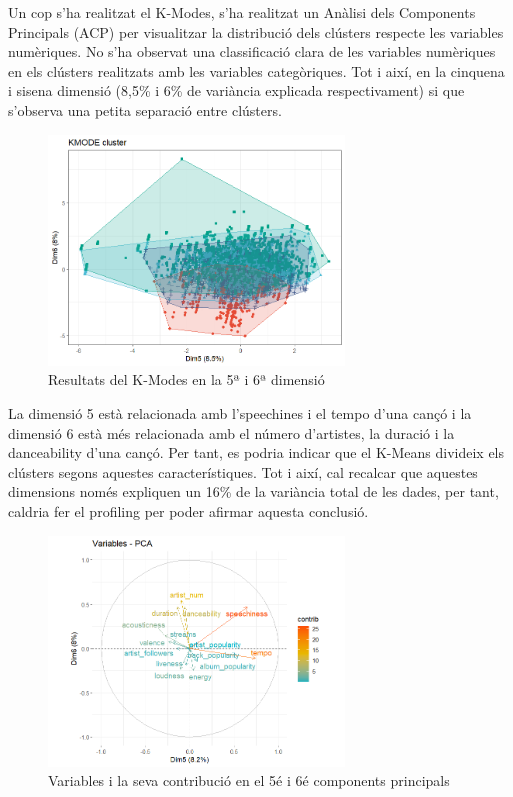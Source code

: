 Un cop s'ha realitzat el K-Modes, s'ha realitzat un Anàlisi dels Components Principals (ACP) per visualitzar la distribució dels clústers respecte les variables numèriques. No s'ha observat una classificació clara de les variables numèriques en els clústers realitzats amb les variables categòriques. Tot i així, en la cinquena i sisena dimensió (8,5\% i 6\% de variància explicada respectivament) si que s'observa una petita separació entre clústers.  \\

\begin{figure}[H]
    \centering
    \includegraphics[width=0.7\textwidth]{Images/4_clustering/KMODES/kmodes1.png}
    \caption{Resultats del K-Modes en la 5ª i 6ª dimensió}
    \label{fig:kmodes1}
\end{figure}

La dimensió 5 està relacionada amb l'speechines i el tempo d'una cançó i la dimensió 6 està més relacionada amb el número d'artistes, la duració i la danceability d'una cançó. Per tant, es podria indicar que el K-Means divideix els clústers segons aquestes característiques. Tot i així, cal recalcar que aquestes dimensions només expliquen un 16\% de la variància total de les dades, per tant, caldria fer el profiling per poder afirmar aquesta conclusió.

\begin{figure}[H]
    \centering
    \includegraphics[width=0.7\textwidth]{Images/4_clustering/KMODES/kmodes2.png}
    \caption{Variables i la seva contribució en el 5é i 6é components principals}
    \label{fig:kmodes2}
\end{figure}

